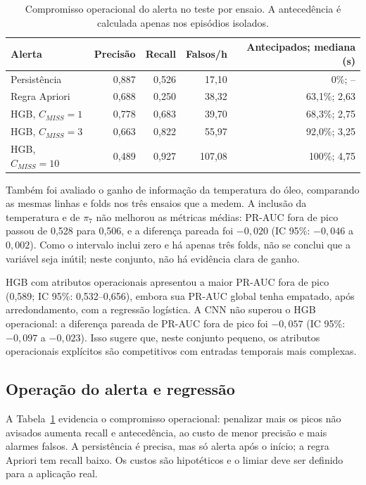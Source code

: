 \documentclass[10pt,a4paper]{article}
\begin{document}
\begin{table}[ht]
\centering
\small
\caption{Compromisso operacional do alerta no teste por ensaio. A antecedência é calculada apenas nos episódios isolados.}
\label{tab:alerta}
\begin{tabular}{lrrrr}
\toprule
Alerta & Precisão & Recall & Falsos/h & Antecipados; mediana (s) \\
\midrule
Persistência & 0{,}887 & 0{,}526 & 17{,}10 & 0\%; -- \\
Regra Apriori & 0{,}688 & 0{,}250 & 38{,}32 & 63{,}1\%; 2{,}63 \\
HGB, $C_{MISS}=1$ & 0{,}778 & 0{,}683 & 39{,}70 & 68{,}3\%; 2{,}75 \\
HGB, $C_{MISS}=3$ & 0{,}663 & 0{,}822 & 55{,}97 & 92{,}0\%; 3{,}25 \\
HGB, $C_{MISS}=10$ & 0{,}489 & 0{,}927 & 107{,}08 & 100\%; 4{,}75 \\
\bottomrule
\end{tabular}
\end{table}

Também foi avaliado o ganho de informação da temperatura do óleo, comparando as mesmas linhas e folds nos três ensaios que a medem. A inclusão da temperatura e de $\pi_7$ não melhorou as métricas médias: PR-AUC fora de pico passou de 0{,}528 para 0{,}506, e a diferença pareada foi $-0{,}020$ (IC 95\%: $-0{,}046$ a $0{,}002$). Como o intervalo inclui zero e há apenas três folds, não se conclui que a variável seja inútil; neste conjunto, não há evidência clara de ganho.

HGB com atributos operacionais apresentou a maior PR-AUC fora de pico (0{,}589; IC 95\%: 0{,}532--0{,}656), embora sua PR-AUC global tenha empatado, após arredondamento, com a regressão logística. A CNN não superou o HGB operacional: a diferença pareada de PR-AUC fora de pico foi $-0{,}057$ (IC 95\%: $-0{,}097$ a $-0{,}023$). Isso sugere que, neste conjunto pequeno, os atributos operacionais explícitos são competitivos com entradas temporais mais complexas.

\subsection{Operação do alerta e regressão}
A Tabela~\ref{tab:alerta} evidencia o compromisso operacional: penalizar mais os picos não avisados aumenta recall e antecedência, ao custo de menor precisão e mais alarmes falsos. A persistência é precisa, mas só alerta após o início; a regra Apriori tem recall baixo. Os custos são hipotéticos e o limiar deve ser definido para a aplicação real.
\end{document}
